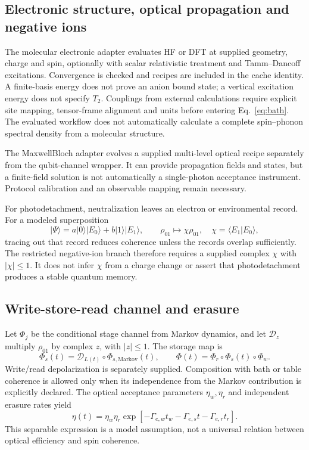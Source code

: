 \documentclass[11pt,a4paper]{article}
\newcommand{\D}{\mathcal D}
\newcommand{\ket}[1]{\lvert #1\rangle}
\begin{document}
\subsection{Electronic structure, optical propagation and negative ions}
The molecular electronic adapter evaluates HF or DFT at supplied geometry, charge and spin, optionally with scalar relativistic treatment and Tamm--Dancoff excitations. Convergence is checked and recipes are included in the cache identity. A finite-basis energy does not prove an anion bound state; a vertical excitation energy does not specify $T_2$. Couplings from external calculations require explicit site mapping, tensor-frame alignment and units before entering Eq.~\eqref{eq:bath}. The evaluated workflow does not automatically calculate a complete spin--phonon spectral density from a molecular structure.

The MaxwellBloch adapter evolves a supplied multi-level optical recipe separately from the qubit-channel wrapper. It can provide propagation fields and states, but a finite-field solution is not automatically a single-photon acceptance instrument. Protocol calibration and an observable mapping remain necessary.

For photodetachment, neutralization leaves an electron or environmental record. For a modeled superposition
\begin{equation}
\ket\Psi=a\ket0\ket{E_0}+b\ket1\ket{E_1},\qquad
\rho_{01}\longmapsto\chi\rho_{01},\quad \chi=\langle E_1|E_0\rangle,
\end{equation}
tracing out that record reduces coherence unless the records overlap sufficiently. The restricted negative-ion branch therefore requires a supplied complex $\chi$ with $|\chi|\leq1$. It does not infer $\chi$ from a charge change or assert that photodetachment produces a stable quantum memory.

\subsection{Write-store-read channel and erasure}
\label{sec:instrument}
Let $\Phi_j$ be the conditional stage channel from Markov dynamics, and let $\D_z$ multiply $\rho_{01}$ by complex $z$, with $|z|\leq1$. The storage map is
\begin{equation}
\Phi_s(t)=\D_{L(t)}\circ\Phi_{s,\mathrm{Markov}}(t),\qquad
\Phi(t)=\Phi_r\circ\Phi_s(t)\circ\Phi_w.
\end{equation}
Write/read depolarization is separately supplied. Composition with bath or table coherence is allowed only when its independence from the Markov contribution is explicitly declared. The optical acceptance parameters $\eta_w,\eta_r$ and independent erasure rates yield
\begin{equation}
\eta(t)=\eta_w\eta_r\exp[-\Gamma_{e,w}t_w-\Gamma_{e,s}t-\Gamma_{e,r}t_r].
\label{eq:eta}
\end{equation}
This separable expression is a model assumption, not a universal relation between optical efficiency and spin coherence.
\end{document}
